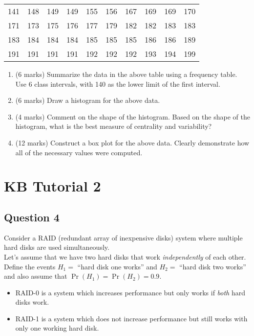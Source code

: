 \documentclass[]{article}
\begin{document}
\begin{table}[ht]
	\begin{center}
		\begin{tabular}{|rrrrrrrrrr|}
			
			\hline
			141 & 148 & 149 & 149 & 155 & 156 & 167 & 169 & 169 & 170 \\
			171 & 173 & 175 & 176 & 177 & 179 & 182 & 182 & 183 & 183 \\
			183 & 184 & 184 & 184 & 185 & 185 & 185 & 186 & 186 & 189 \\
			191 & 191 & 191 & 191 & 192 & 192 & 192 & 193 & 194 & 199 \\
			\hline
		\end{tabular}
	\end{center}
\end{table}
\vspace{-0.5cm}
\begin{enumerate}
	\item (6 marks) Summarize the data in the above table using a frequency table. Use 6 class intervals, with 140 as the lower limit of the first interval.
	\item (6 marks) Draw a histogram for the above data.
	\item (4 marks) Comment on the shape of the histogram. Based on the shape of the histogram, what is the best measure of centrality and variability?
	\item (12 marks) Construct a box plot for the above data. Clearly demonstrate how all of the necessary values were computed.
\end{enumerate}


\section{KB Tutorial 2}

\subsection*{Question 4}
Consider a RAID (redundant array of inexpensive disks) system where multiple hard disks are used simultaneously.\\[0.2cm]
Let's assume that we have two hard disks that work \emph{independently} of each other. Define the events $H_1 =$ ``hard disk one works'' and $H_2 =$ ``hard disk two works'' and also assume that $\Pr(H_1) = \Pr(H_2) = 0.9$.\\ \smallskip
\begin{itemize}
	\item RAID-0 is a system which increases performance but only works if \emph{both} hard disks work.
	\item RAID-1 is a system which does not increase performance but still works with only one working hard disk.
\end{itemize}
\end{document}
